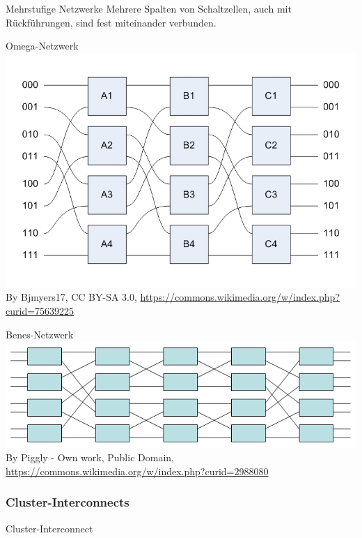 \begin{defi}{Mehrstufige Netzwerke}
    Mehrere Spalten von Schaltzellen, auch mit Rückführungen, 
    sind fest miteinander verbunden.
\end{defi}

\begin{defi}{Omega-Netzwerk}
    \includegraphics[width=\textwidth]{includes/graphics/OmegaNetwork.jpg}
    By Bjmyers17, CC BY-SA 3.0, \url{https://commons.wikimedia.org/w/index.php?curid=75639225}
\end{defi}

\begin{defi}{Benes-Netzwerk}
    \includegraphics[width=\textwidth]{includes/graphics/Benesnetwork.png}
    By Piggly - Own work, Public Domain, \url{https://commons.wikimedia.org/w/index.php?curid=2988080}
\end{defi}

\subsubsection{Cluster-Interconnects}

\begin{defi}{Cluster-Interconnect}
    
\end{defi}

